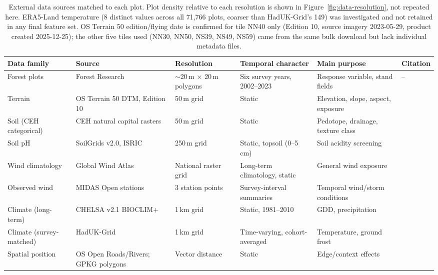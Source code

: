 
\begin{table}[!htbp]
\centering
\scriptsize
\setlength{\tabcolsep}{3pt}
\renewcommand{\arraystretch}{0.95}
\begin{tabular}{p{1.7cm}p{2.2cm}p{1.8cm}p{2.3cm}p{2.6cm}p{2.9cm}}
\hline
Data family & Source & Resolution & Temporal character & Main purpose & Citation \\
\hline
Forest plots & Forest Research & $\sim$20\,m $\times$ 20\,m polygons & Six survey years, 2002--2023 & Response variable, stand fields & -- \\
Terrain & OS Terrain 50 DTM, Edition 10 & 50\,m grid & Static & Elevation, slope, aspect, exposure & \ct{Ordnance Survey, OS Terrain 50 -- edition/date confirmed for tile NN40 only, see table note} \\
Soil (CEH categorical) & CEH natural capital rasters & 50\,m grid & Static & Pedotope, drainage, texture class & \ct{UKCEH, natural capital rasters} \\
Soil pH & SoilGrids v2.0, ISRIC & 250\,m grid & Static, topsoil (0--5\,cm) & Soil acidity screening & \ct{SoilGrids v2.0, ISRIC} \\
Wind climatology & Global Wind Atlas & National raster grid & Long-term climatology, static & General wind exposure & \ct{Global Wind Atlas, DTU Wind Energy / World Bank ESMAP} \\
Observed wind & MIDAS Open stations & 3 station points & Survey-interval summaries & Temporal wind/storm conditions & \ct{Met Office, MIDAS Open} \\
Climate (long-term) & CHELSA v2.1 BIOCLIM+ & 1\,km grid & Static, 1981--2010 & GDD, precipitation & \ct{CHELSA v2.1} \\
Climate (survey-matched) & HadUK-Grid & 1\,km grid & Time-varying, cohort-averaged & Temperature, ground frost & \ct{Met Office / CEDA, HadUK-Grid} \\
Spatial position & OS Open Roads/Rivers; GPKG polygons & Vector distance & Static & Edge/context effects & \ct{Ordnance Survey, OS Open Roads / OS Open Rivers} \\
\hline
\end{tabular}
\caption{External data sources matched to each plot. Plot density relative to each resolution is
shown in Figure~\ref{fig:data-resolution}, not repeated here. ERA5-Land temperature (8 distinct
values across all 71,766 plots, coarser than HadUK-Grid's 149) was investigated and not retained
in any final feature set. OS Terrain 50 edition/flying date is confirmed for tile NN40 only
(Edition 10, source imagery 2023-05-29, product created 2025-12-25); the other five tiles used
(NN30, NN50, NS39, NS49, NS59) came from the same bulk download but lack individual metadata files.}
\label{tab:data-env-sources}
\end{table}

